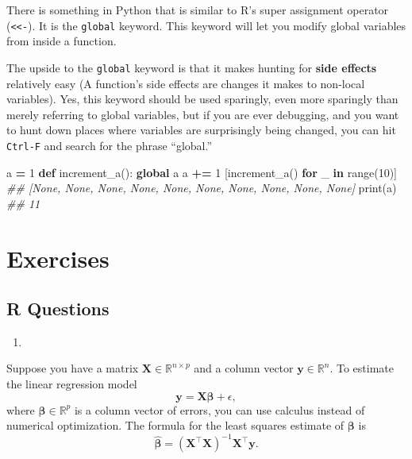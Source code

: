 \documentclass[12pt,krantz2]{krantz}
\makeatletter
\newenvironment{Shaded}{\begin{snugshade}}{\end{snugshade}}
\newcommand{\BuiltInTok}[1]{#1}
\newcommand{\CommentTok}[1]{\textcolor[rgb]{0.37,0.37,0.37}{\textit{#1}}}
\newcommand{\ControlFlowTok}[1]{\textcolor[rgb]{0.27,0.27,0.27}{\textbf{#1}}}
\newcommand{\DecValTok}[1]{\textcolor[rgb]{0.06,0.06,0.06}{#1}}
\newcommand{\KeywordTok}[1]{\textcolor[rgb]{0.27,0.27,0.27}{\textbf{#1}}}
\newcommand{\NormalTok}[1]{#1}
\newcommand{\OperatorTok}[1]{\textcolor[rgb]{0.43,0.43,0.43}{\textbf{#1}}}
\newenvironment{kframe}{%
\medskip{}
\setlength{\fboxsep}{.8em}
 \def\at@end@of@kframe{}%
 \ifinner\ifhmode%
  \def\at@end@of@kframe{\end{minipage}}%
  \begin{minipage}{\columnwidth}%
 \fi\fi%
 \def\FrameCommand##1{\hskip\@totalleftmargin \hskip-\fboxsep
 \colorbox{shadecolor}{##1}\hskip-\fboxsep
     \hskip-\linewidth \hskip-\@totalleftmargin \hskip\columnwidth}%
 \MakeFramed {\advance\hsize-\width
   \@totalleftmargin\z@ \linewidth\hsize
   \@setminipage}}%
 {\par\unskip\endMakeFramed%
 \at@end@of@kframe}
\renewenvironment{Shaded}{\begin{kframe}}{\end{kframe}}
\makeatother
\begin{document}
There is something in Python that is similar to R's super assignment operator (\texttt{\textless{}\textless{}-}). It is the \texttt{global} keyword. This keyword will let you modify global variables from inside a function.

\begin{rmd-details}
The upside to the \texttt{global} keyword is that it makes hunting for \textbf{side effects} relatively easy (A function's side effects are changes it makes to non-local variables). Yes, this keyword should be used sparingly, even more sparingly than merely referring to global variables, but if you are ever debugging, and you want to hunt down places where variables are surprisingly being changed, you can hit \texttt{Ctrl-F} and search for the phrase ``global.''

\end{rmd-details}

\begin{Shaded}
\begin{Highlighting}[]
\NormalTok{a }\OperatorTok{=} \DecValTok{1}
\KeywordTok{def}\NormalTok{ increment_a():}
    \KeywordTok{global}\NormalTok{ a}
\NormalTok{    a }\OperatorTok{+=} \DecValTok{1}
\NormalTok{[increment_a() }\ControlFlowTok{for}\NormalTok{ _ }\KeywordTok{in} \BuiltInTok{range}\NormalTok{(}\DecValTok{10}\NormalTok{)]}
\CommentTok{## [None, None, None, None, None, None, None, None, None, None]}
\BuiltInTok{print}\NormalTok{(a)}
\CommentTok{## 11}
\end{Highlighting}
\end{Shaded}

\hypertarget{exercises-4}{%
\section{Exercises}\label{exercises-4}}

\hypertarget{r-questions-4}{%
\subsection{R Questions}\label{r-questions-4}}

\begin{enumerate}
\def\labelenumi{\arabic{enumi}.}
\item
\end{enumerate}

Suppose you have a matrix \(\mathbf{X} \in \mathbb{R}^{n \times p}\) and a column vector \(\mathbf{y} \in \mathbb{R}^{n}\). To estimate the linear regression model
\begin{equation} 
\mathbf{y} = \mathbf{X}\boldsymbol{\beta} + \epsilon,
\end{equation}
where \(\boldsymbol{\beta} \in \mathbb{R}^p\) is a column vector of errors, you can use calculus instead of numerical optimization. The formula for the least squares estimate of \(\boldsymbol{\beta}\) is
\begin{equation} 
\hat{\boldsymbol{\beta}} = (\mathbf{X}^\intercal \mathbf{X})^{-1} \mathbf{X}^\intercal \mathbf{y}.
\end{equation}
\end{document}
